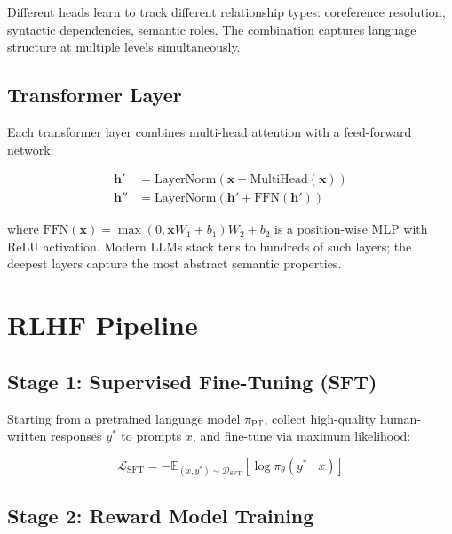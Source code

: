 Different heads learn to track different relationship types: coreference resolution, syntactic dependencies, semantic roles. The combination captures language structure at multiple levels simultaneously.

\subsection{Transformer Layer}

Each transformer layer combines multi-head attention with a feed-forward network:

\begin{align}
\mathbf{h}' &= \text{LayerNorm}(\mathbf{x} + \text{MultiHead}(\mathbf{x})) \label{eq:tf-layer1} \\
\mathbf{h}'' &= \text{LayerNorm}(\mathbf{h}' + \text{FFN}(\mathbf{h}')) \label{eq:tf-layer2}
\end{align}

where $\text{FFN}(\mathbf{x}) = \max(0, \mathbf{x}W_1 + b_1)W_2 + b_2$ is a position-wise MLP with ReLU activation. Modern LLMs stack tens to hundreds of such layers; the deepest layers capture the most abstract semantic properties.

\section{RLHF Pipeline}
\label{sec:app10-rlhf}

\subsection{Stage 1: Supervised Fine-Tuning (SFT)}

Starting from a pretrained language model $\pi_{\text{PT}}$, collect high-quality human-written responses $y^*$ to prompts $x$, and fine-tune via maximum likelihood:

\begin{equation}
\mathcal{L}_{\text{SFT}} = -\mathbb{E}_{(x, y^*) \sim \mathcal{D}_{\text{SFT}}} \left[\log \pi_\theta(y^* \mid x)\right]
\label{eq:sft}
\end{equation}

\subsection{Stage 2: Reward Model Training}

